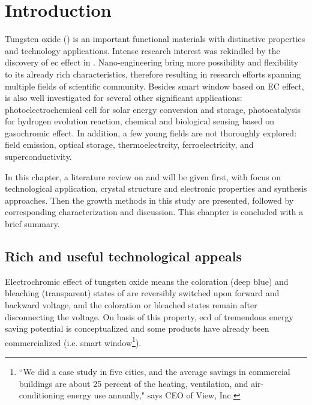 
\section{Introduction}

Tungsten oxide () is an important functional materials with distinctive properties and technology applications. Intense research interest was rekindled by the discovery of \gls{ec} effect in \citeyear{Granqvist1993}.\cite{Granqvist1993}  Nano-engineering  bring more possibility and flexibility to its already rich characteristics, therefore resulting in research efforts spanning multiple fields of scientific community. Besides smart window based on EC effect,  is also well investigated for several other significant applications: photoelectrochemical cell for solar energy conversion and storage, photocatalysis for hydrogen evolution reaction, chemical and biological sensing based on gasochromic effect. In addition, a few young fields are not thoroughly explored: field emission, optical storage, thermoelectrcity, ferroelectricity, and superconductivity.

In this chapter, a literature review on  and  will be given first, with focus on technological application, crystal structure and electronic properties and synthesis approaches. Then the growth methods in this study are presented, followed by corresponding characterization and discussion. This chanpter is concluded with a brief summary.

\subsection{Rich and useful technological appeals}

Electrochromic effect of tungsten oxide means the coloration (deep blue) and bleaching (transparent) states of  are reversibly switched upon forward and backward voltage, and the coloration or bleached states remain after disconnecting the voltage. On basis of this property, \gls{ecd} of tremendous energy saving potential is conceptualized and some products have already been commercialized (i.e. smart window\footnote{``We did a case study in five cities, and the average savings in commercial buildings are about 25 percent of the heating, ventilation, and air-conditioning energy use annually," says CEO of View, Inc.}).

